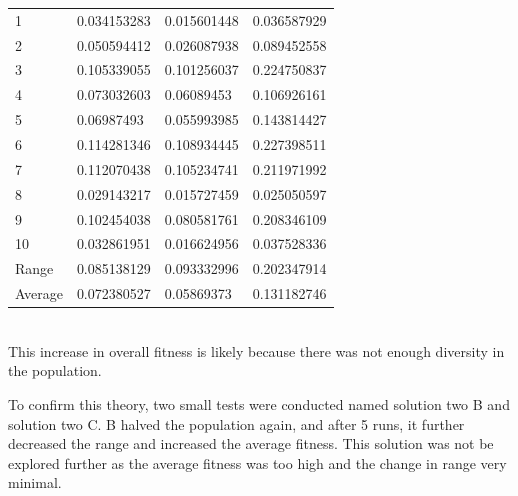 \documentclass[sigconf]{acmart}
\begin{document}
%
%
\begin{supertabular}{@{}p{0.1\columnwidth}p{0.25\columnwidth}p{0.25\columnwidth}p{0.25\columnwidth}}
    1&0.034153283&0.015601448&0.036587929\\
    2&0.050594412&0.026087938&0.089452558\\
    3&0.105339055&0.101256037&0.224750837\\
    4&0.073032603&0.06089453&0.106926161\\
    5&0.06987493&0.055993985&0.143814427\\
    6&0.114281346&0.108934445&0.227398511\\
    7&0.112070438&0.105234741&0.211971992\\
    8&0.029143217&0.015727459&0.025050597\\
    9&0.102454038&0.080581761&0.208346109\\
    10&0.032861951&0.016624956&0.037528336\\
    Range&0.085138129&0.093332996&0.202347914\\
    Average&0.072380527&0.05869373&0.131182746\\
    
\end{supertabular}%
\\
This increase in overall fitness is likely because there was not enough diversity in the population.

To confirm this theory, two small tests were conducted named solution two B and solution two C. B halved the population again, and after 5 runs, it further decreased the range and increased the average fitness. This solution was not be explored further as the average fitness was too high and the change in range very minimal.
\end{document}

